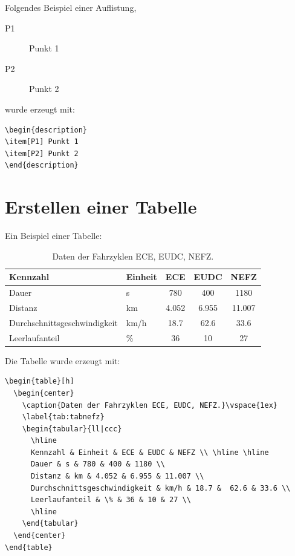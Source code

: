 Folgendes Beispiel einer Auflistung,
\begin{description}
\item[P1] Punkt 1
\item[P2] Punkt 2
\end{description}
wurde erzeugt mit:
\begin{verbatim}
\begin{description}
\item[P1] Punkt 1
\item[P2] Punkt 2
\end{description}
\end{verbatim}


\section{Erstellen einer Tabelle}\label{sec:tabellen}

Ein Beispiel einer Tabelle:
\begin{table}[h]
  \begin{center}
    \caption{Daten der Fahrzyklen ECE, EUDC, NEFZ.}\vspace{1ex}
    \label{tab:tabnefz}
    \begin{tabular}{ll|ccc}
      \hline
      Kennzahl & Einheit & ECE & EUDC & NEFZ \\ \hline \hline
      Dauer & s & 780 & 400 & 1180 \\
      Distanz & km & 4.052 & 6.955 & 11.007 \\
      Durchschnittsgeschwindigkeit & km/h & 18.7 &  62.6 & 33.6 \\
      Leerlaufanteil & \% & 36 & 10 & 27 \\
      \hline
    \end{tabular}
  \end{center}
\end{table}

Die Tabelle wurde erzeugt mit:
\begin{verbatim}
\begin{table}[h]
  \begin{center}
    \caption{Daten der Fahrzyklen ECE, EUDC, NEFZ.}\vspace{1ex}
    \label{tab:tabnefz}
    \begin{tabular}{ll|ccc}
      \hline
      Kennzahl & Einheit & ECE & EUDC & NEFZ \\ \hline \hline
      Dauer & s & 780 & 400 & 1180 \\
      Distanz & km & 4.052 & 6.955 & 11.007 \\
      Durchschnittsgeschwindigkeit & km/h & 18.7 &  62.6 & 33.6 \\
      Leerlaufanteil & \% & 36 & 10 & 27 \\
      \hline
    \end{tabular}
  \end{center}
\end{table}
\end{verbatim}


